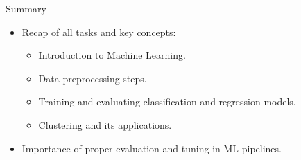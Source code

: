 \documentclass{beamer}
\begin{document}
\begin{frame}{Summary}
\begin{itemize}
    \item Recap of all tasks and key concepts:
    \begin{itemize}
        \item Introduction to Machine Learning.
        \item Data preprocessing steps.
        \item Training and evaluating classification and regression models.
        \item Clustering and its applications.
    \end{itemize}
    \item Importance of proper evaluation and tuning in ML pipelines.
\end{itemize}
\end{frame}
\end{document}
